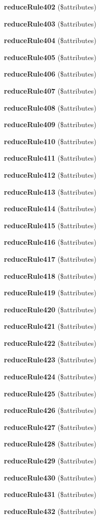 \begin{DoxyCompactItemize}
{\bf reduce\+Rule402} (\$attributes)
\item 
{\bf reduce\+Rule403} (\$attributes)
\item 
{\bf reduce\+Rule404} (\$attributes)
\item 
{\bf reduce\+Rule405} (\$attributes)
\item 
{\bf reduce\+Rule406} (\$attributes)
\item 
{\bf reduce\+Rule407} (\$attributes)
\item 
{\bf reduce\+Rule408} (\$attributes)
\item 
{\bf reduce\+Rule409} (\$attributes)
\item 
{\bf reduce\+Rule410} (\$attributes)
\item 
{\bf reduce\+Rule411} (\$attributes)
\item 
{\bf reduce\+Rule412} (\$attributes)
\item 
{\bf reduce\+Rule413} (\$attributes)
\item 
{\bf reduce\+Rule414} (\$attributes)
\item 
{\bf reduce\+Rule415} (\$attributes)
\item 
{\bf reduce\+Rule416} (\$attributes)
\item 
{\bf reduce\+Rule417} (\$attributes)
\item 
{\bf reduce\+Rule418} (\$attributes)
\item 
{\bf reduce\+Rule419} (\$attributes)
\item 
{\bf reduce\+Rule420} (\$attributes)
\item 
{\bf reduce\+Rule421} (\$attributes)
\item 
{\bf reduce\+Rule422} (\$attributes)
\item 
{\bf reduce\+Rule423} (\$attributes)
\item 
{\bf reduce\+Rule424} (\$attributes)
\item 
{\bf reduce\+Rule425} (\$attributes)
\item 
{\bf reduce\+Rule426} (\$attributes)
\item 
{\bf reduce\+Rule427} (\$attributes)
\item 
{\bf reduce\+Rule428} (\$attributes)
\item 
{\bf reduce\+Rule429} (\$attributes)
\item 
{\bf reduce\+Rule430} (\$attributes)
\item 
{\bf reduce\+Rule431} (\$attributes)
\item 
{\bf reduce\+Rule432} (\$attributes)
\item 

\end{DoxyCompactItemize}
